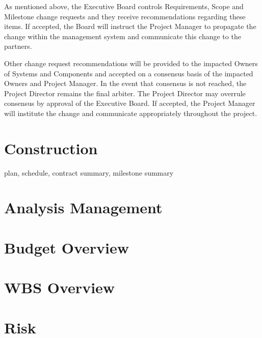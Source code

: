 \documentclass[preprint]{aastex}
\begin{document}
As mentioned above, the Executive Board controls Requirements, Scope and Milestone change requests
and they receive recommendations regarding these items.  If accepted, the Board will instruct the Project Manager to 
propagate the change within the management system and communicate this change to the partners.

Other change request recommendations will be provided to the impacted Owners of Systems and
Components and accepted on a consensus basis of the impacted Owners and Project Manager.  
In the event that consensus is not reached, the Project Director remains the final arbiter.  The Project 
Director may overrule consensus by approval of the Executive Board.  If accepted, the Project Manager 
will institute the change and communicate appropriately throughout the project.

\section{Construction}
plan, schedule, contract summary, milestone summary

\section{Analysis Management}

\section{Budget Overview}

\section{WBS Overview}

\section{Risk}
\end{document}
